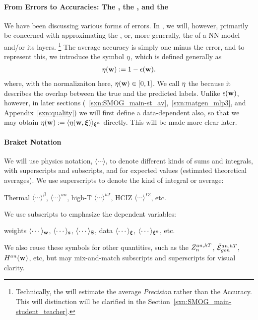 \paragraph{From Errors to Accuracies: The \AverageGeneralizationAccuracy, the \Quality, and the \SelfOverlap}
We have been discussing various forms of errors.
In \SETOL, we will, however, primarily be concerned with approximating the \emph{\AverageGeneralizationAccuracy},
or, more generally, the \Quality of a NN model and/or its layers.
\footnote{Technically, the \Quality will estimate the average \emph{Precision} rather than the Accuracy.
This will distinction will be clarified in the Section~\ref{sxn:SMOG_main-student_teacher}.}
The average accuracy is simply one minus the error, and to represent this,
we introduce the symbol $\eta$, which is defined generally as
\begin{align}
 \label{eqn:def_eta}
 \eta({\mathbf{w}}) := 1-\epsilon({\mathbf{w}}).
\end{align}
where, with the normalizaiton here, $\eta({\mathbf{w}})\in[0,1]$.
We call $\eta$ the \emph{\SelfOverlap} because it describes the overlap between the true and the predicted labels.
Unlike $\epsilon({\mathbf{w}})$, however, in later sections
(~\ref{sxn:SMOG_main-st_av},~\ref{sxn:matgen_mlp3}, and Appendix~\ref{sxn:quality})
we will first define a data-dependent \SelfOverlap also, so that we may obtain
 $\eta({\mathbf{w}}):=\langle\eta({\mathbf{w}},\boldsymbol{\xi})\rangle_{\boldsymbol{\xi}^{n}}$ directly.
This will be made more clear later.

\paragraph{Braket Notation}
We will use physics \BraKet notation, $\langle\cdots\rangle$,
to denote different kinds of sums and integrals, with superscripts and subscripts,
and for expected values (estimated theoretical averages).
We use superscripts to denote the kind of integral or average:
\begin{center}
Thermal $\langle\cdots\rangle^{\beta}$,
\Annealed $\langle\cdots\rangle^{an}$,
high-T $\langle\cdots\rangle^{hT}$,
HCIZ $\langle\cdots\rangle^{IZ}$, etc.
\end{center}
We use subscripts to emphasize the dependent variables:
\begin{center}
  weights $\langle\cdots\rangle_{{\mathbf{w}}}$, $\langle\cdots\rangle_{{\mathbf{s}}}$, $\langle\cdots\rangle_{{\mathbf{S}}}$,
data $\langle\cdots\rangle_{\boldsymbol{\xi}}$, $\langle\cdots\rangle_{\boldsymbol{\xi}^{n}}$, etc.
\end{center}
We also reuse these symbols for other quantities, such as the $Z^{an,hT}_{n}$, $\bar{\mathcal{E}}_{gen}^{an,hT}$, $H^{an}({\mathbf{w}})$, etc,
but may mix-and-match subscripts and superscripts for visual clarity.

